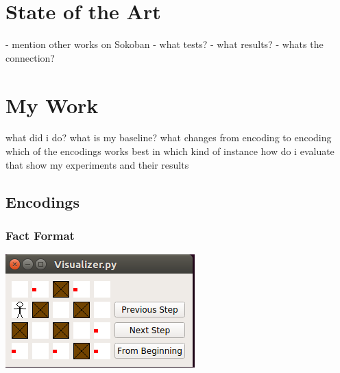 \documentclass{report}
\begin{document}
\chapter{State of the Art}

- mention other works on Sokoban
- what tests?
- what results?
- whats the connection?
\chapter{My Work}
what did i do?
what is my baseline?
what changes from encoding to encoding
which of the encodings works best in which kind of instance
how do i evaluate that
show my experiments and their results
\section{Encodings}
\subsection{Fact Format}
\includegraphics{Visualizer}

\end{document}
